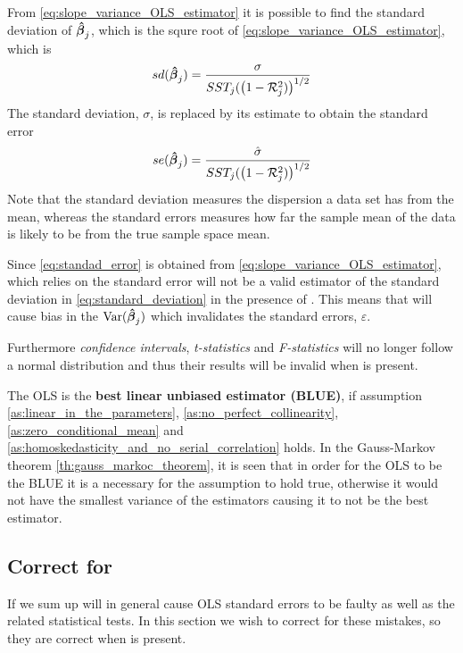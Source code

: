 From \eqref{eq:slope_variance_OLS_estimator} it is possible to find the standard deviation of $\operatorname{\boldsymbol{\hat{\beta}}}_j$, which is the squre root of \ref{eq:slope_variance_OLS_estimator}, which is
\begin{align}\label{eq:standard_deviation}
    sd(\operatorname{\boldsymbol{\hat{\beta}}}_j) = \dfrac{\sigma}{SST_j(\big(1- \mathcal{R}_j^2)\big)^{1/2}}
\end{align}
The standard deviation, $\sigma$, is replaced by its estimate to obtain the standard error
\begin{align}\label{eq:standad_error}
    se(\operatorname{\boldsymbol{\hat{\beta}}}_j) = \dfrac{\hat{\sigma}}{SST_j(\big(1- \mathcal{R}_j^2)\big)^{1/2}}
\end{align}
Note that the standard deviation measures the dispersion a data set has from the mean, whereas the standard errors measures how far the sample mean of the data is likely to be from the true sample space mean. 

Since \eqref{eq:standad_error} is obtained from \eqref{eq:slope_variance_OLS_estimator}, which relies on \homo the standard error will not be a valid estimator of the standard deviation in \eqref{eq:standard_deviation} in the presence of \hetero. This means that \hetero will cause bias in the $\operatorname{\text{Var}}(\operatorname{\boldsymbol{\hat{\beta}}}_j)$ which invalidates the standard errors, $\varepsilon$. 

Furthermore \textit{confidence intervals}, \textit{t-statistics} and \textit{F-statistics} will no longer follow a normal distribution and thus their results will be invalid when \hetero is present. 


The OLS is the \textbf{best linear unbiased estimator (BLUE)}, if assumption  \ref{as:linear_in_the_parameters}, \ref{as:no_perfect_collinearity}, \ref{as:zero_conditional_mean} and \ref{as:homoskedasticity_and_no_serial_correlation} holds. In the Gauss-Markov theorem \ref{th:gauss_markoc_theorem}, it is seen that in order for the OLS to be the BLUE it is a necessary for the \homo assumption to hold true, otherwise it would not have the smallest variance of the estimators causing it to not be the best estimator.





\subsection{Correct for \hetero}
If we sum up \hetero will in general cause OLS standard errors to be faulty as well as the related statistical tests. In this section we wish to correct for these mistakes, so they are correct when \hetero is present. 


